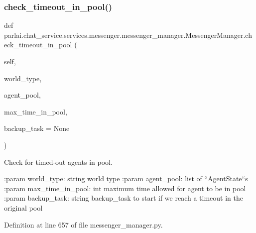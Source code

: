 \subsubsection{\texorpdfstring{check\+\_\+timeout\+\_\+in\+\_\+pool()}{check\_timeout\_in\_pool()}}
{\footnotesize\ttfamily def parlai.\+chat\+\_\+service.\+services.\+messenger.\+messenger\+\_\+manager.\+Messenger\+Manager.\+check\+\_\+timeout\+\_\+in\+\_\+pool (\begin{DoxyParamCaption}\item[{}]{self,  }\item[{}]{world\+\_\+type,  }\item[{}]{agent\+\_\+pool,  }\item[{}]{max\+\_\+time\+\_\+in\+\_\+pool,  }\item[{}]{backup\+\_\+task = {\ttfamily None} }\end{DoxyParamCaption})}

\begin{DoxyVerb}Check for timed-out agents in pool.

:param world_type:
    string world type
:param agent_pool:
    list of ``AgentState``s
:param max_time_in_pool:
    int maximum time allowed for agent to be in pool
:param backup_task:
    string backup_task to start if we reach a timeout in the original pool
\end{DoxyVerb}
 

Definition at line 657 of file messenger\+\_\+manager.\+py.


